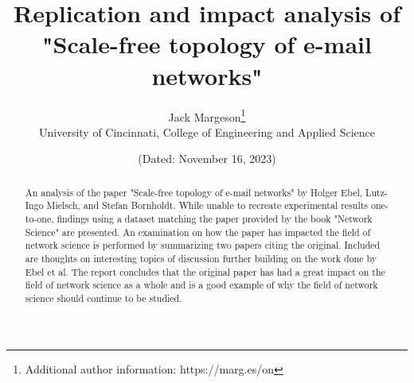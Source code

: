 \documentclass[11pt]{article}
\title{Replication and impact analysis of\\"Scale-free topology of e-mail networks" }
\author{Jack Margeson\thanks{Additional author information: https://marg.es/on}\\
University of Cincinnati, College of Engineering and Applied Science}
\date{\normalsize{(Dated: November 16, 2023)}}
\begin{document}
\maketitle

\vspace{-3mm} %

\begin{abstract}
    An analysis of the paper "Scale-free topology of e-mail networks" by Holger Ebel, Lutz-Ingo Mielsch, and Stefan Bornholdt. While unable to recreate experimental results one-to-one, findings using a dataset matching the paper provided by the book "Network Science" are presented. An examination on how the paper has impacted the field of network science is performed by summarizing two papers citing the original. Included are thoughts on interesting topics of discussion further building on the work done by Ebel et al. The report concludes that the original paper has had a great impact on the field of network science as a whole and is a good example of why the field of network science should continue to be studied.   
\end{abstract}

\vspace{5mm} %
\end{document}
